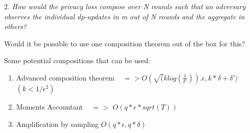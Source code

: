 \documentclass{article}
\theoremstyle{remark}
\theoremstyle{definition}
\begin{document}

2. \emph{How would the privacy loss compose over N rounds such that an adversary observes the individual dp-updates in m out of N rounds and the aggregate in others?}  

	Would it be possible to use one composition theorem out of the box for this?

	Some potential compositions that can be used:
	\begin{enumerate}
		\item Advanced composition theorem ~\cite{Vadhan:2017} $=>O(\sqrt(klog(\frac{1}{\delta'})).\epsilon, k*\delta + \delta')$ $(k < 1/\epsilon^{2})$
		\item Moments Accountant ~\cite{Abadi:2016} $=>$ $O(q*\epsilon*sqrt(T))$ 
		\item Amplification by sampling $O(q*\epsilon, q*\delta)$ ~\cite{Abadi:2016} 

	\end{enumerate}

{\footnotesize 
}
\end{document}

